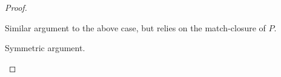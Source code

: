 \documentclass[acmsmall,screen,nonacm,review]{acmart}
\begin{document}
\begin{lemma}
\begin{proof}
\begin{proofcases}
\begin{proofcases}
\begin{proofcases}

	      \begin{llproof}
		Similar argument to the above case, but relies on the match-closure of $P$.
	      \end{llproof}
	  \end{proofcases}


	  \proofcase{$\impliedby$}

	  \begin{llproof}
	    Symmetric argument.
	  \end{llproof}
	\end{proofcases}
    \end{proofcases}
  \end{proof}
\end{lemma}
\end{document}

